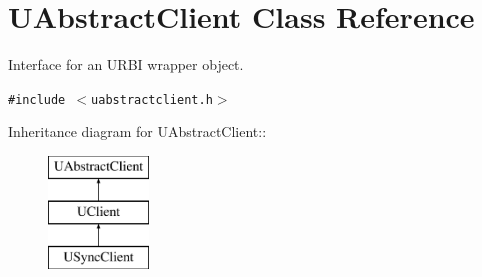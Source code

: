 \section{UAbstract\-Client Class Reference}
\label{classUAbstractClient}
Interface for an URBI wrapper object.  


{\tt \#include $<$uabstractclient.h$>$}

Inheritance diagram for UAbstract\-Client::\begin{figure}[H]
\begin{center}
\leavevmode
\includegraphics[height=3cm]{classUAbstractClient}
\end{center}
\end{figure}
